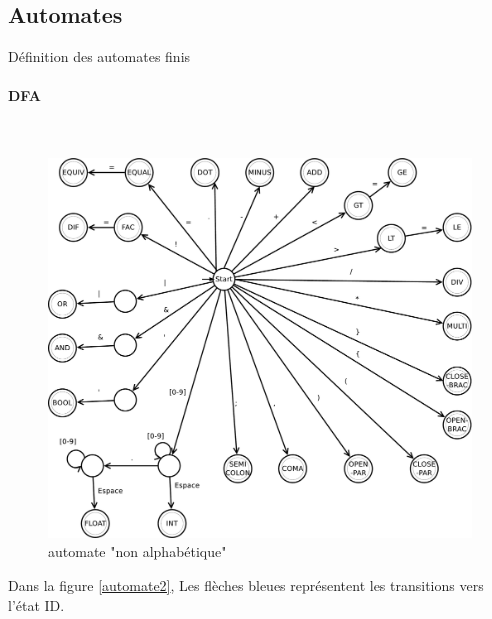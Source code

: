 \documentclass[a4paper,10pt]{article}
\begin{document}
\subsection{Automates}

Définition des automates finis
~\\
\paragraph{DFA}~\\

 \begin{figure}[H] \hspace*{-2cm} 
    \centering
   	  \includegraphics[width=400pt]{automate1.pdf} 
			\caption{automate "non alphabétique"}
			\label{automate1}
  \end{figure}	
  
  	Dans la figure \ref{automate2}, Les flèches bleues représentent les transitions vers l'état ID.
  
\end{document}
